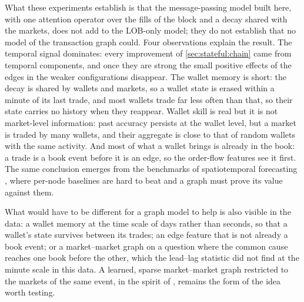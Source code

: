 What these experiments establish is that the message-passing model built here, with one
attention operator over the fills of the block and a decay shared with the markets, does
not add to the LOB-only model; they do not establish that no model of the transaction graph
could.  Four observations explain the result.  The temporal signal dominates: every
improvement of \cref{sec:stateful:chain} came from temporal components, and once they are
strong the small positive effects of the edges in the weaker configurations disappear.  The
wallet memory is short: the decay is shared by wallets and markets, so a wallet state is
erased within a minute of its last trade, and most wallets trade far less often than that,
so their state carries no history when they reappear.  Wallet skill is real but it is not
market-level information: past accuracy persists at the wallet level, but a market is traded
by many wallets, and their aggregate is close to that of random wallets with the same
activity.  And most of what a wallet brings is already in the book: a trade is a book event
before it is an edge, so the order-flow features see it first.  The same conclusion emerges
from the benchmarks of spatiotemporal forecasting \cite{martin2026audit}, where per-node
baselines are hard to beat and a graph must prove its value against them.

What would have to be different for a graph model to help is also visible in the data: a
wallet memory at the time scale of days rather than seconds, so that a wallet's state
survives between its trades; an edge feature that is not already a book event; or a
market--market graph on a question where the common cause reaches one book before the
other, which the lead--lag statistic did not find at the minute scale in this data.  A
learned, sparse market--market graph restricted to the markets of the same event, in the
spirit of \textcite{cini2023sparse}, remains the form of the idea worth testing.

